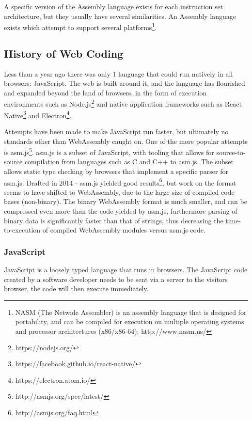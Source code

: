 \documentclass[a4paper]{article}
\begin{document}
A specific version of the Assembly language exists for each instruction set architecture, but they usually have several similarities. An Assembly language exists which attempt to support several platforms\footnote{NASM (The Netwide Assembler) is an assembly language that is designed for portability, and can be compiled for execution on multiple operating systems and processor architectures (x86/x86-64): http://www.nasm.us/}.

\newpage
\subsection{History of Web Coding}
\label{sec:problem-analysis:history}
Less than a year ago there was only 1 language that could run natively in all browsers: JavaScript. The web is built around it, and the language has flourished and expanded beyond the land of browsers, in the form of execution environments such as Node.js\footnote{https://nodejs.org/} and native application frameworks such as React Native\footnote{https://facebook.github.io/react-native/} and Electron\footnote{https://electron.atom.io/}.

Attempts have been made to make JavaScript run faster, but ultimately no standards other than WebAssembly caught on. One of the more popular attempts is asm.js\footnote{http://asmjs.org/spec/latest/}. asm.js is a subset of JavaScript, with tooling that allows for source-to-source compilation from languages such as C and C++ to asm.js. The subset allows static type checking by browsers that implement a specific parser for asm.js. Drafted in 2014 - asm.js yielded good results\footnote{http://asmjs.org/faq.html}, but work on the format seems to have shifted to WebAssembly, due to the large size of compiled code bases (non-binary). The binary WebAssembly format is much smaller, and can be compressed even more than the code yielded by asm.js, furthermore parsing of binary data is significantly faster than that of strings, thus decreasing the time-to-execution of compiled WebAssembly modules versus asm.js code.

\subsubsection{JavaScript}
JavaScript is a loosely typed language that runs in browsers. The JavaScript code created by a software developer needs to be sent via a server to the visitors browser, the code will then execute immediately.
\end{document}
